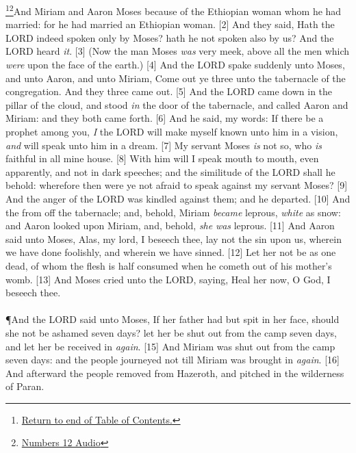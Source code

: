 \footnote{\textcolor[cmyk]{0.99998,1,0,0}{\hyperlink{TOC}{Return to end of Table of Contents.}}}\footnote{\href{https://audiobible.com/bible/numbers_12.html}{\textcolor[cmyk]{0.99998,1,0,0}{Numbers 12 Audio}}}\textcolor[cmyk]{0.99998,1,0,0}{And Miriam and Aaron  Moses because of the Ethiopian woman whom he had married: for he had married an Ethiopian woman.}
[2] \textcolor[cmyk]{0.99998,1,0,0}{And they said, Hath the LORD indeed spoken only by Moses? hath he not spoken also by us? And the LORD heard \emph{it}.}
[3] \textcolor[cmyk]{0.99998,1,0,0}{(Now the man Moses \emph{was} very meek, above all the men which \emph{were} upon the face of the earth.)}
[4] \textcolor[cmyk]{0.99998,1,0,0}{And the LORD spake suddenly unto Moses, and unto Aaron, and unto Miriam, Come out ye three unto the tabernacle of the congregation. And they three came out.}
[5] \textcolor[cmyk]{0.99998,1,0,0}{And the LORD came down in the pillar of the cloud, and stood \emph{in} the door of the tabernacle, and called Aaron and Miriam: and they both came forth.}
[6] \textcolor[cmyk]{0.99998,1,0,0}{And he said,  my words: If there be a prophet among you, \emph{I} the LORD will make myself known unto him in a vision, \emph{and} will speak unto him in a dream.}
[7] \textcolor[cmyk]{0.99998,1,0,0}{My servant Moses \emph{is} not so, who \emph{is} faithful in all mine house.}
[8] \textcolor[cmyk]{0.99998,1,0,0}{With him will I speak mouth to mouth, even apparently, and not in dark speeches; and the similitude of the LORD shall he behold: wherefore then were ye not afraid to speak against my servant Moses?}
[9] \textcolor[cmyk]{0.99998,1,0,0}{And the anger of the LORD was kindled against them; and he departed.}
[10] \textcolor[cmyk]{0.99998,1,0,0}{And the  from off the tabernacle; and, behold, Miriam \emph{became} leprous, \emph{white} as snow: and Aaron looked upon Miriam, and, behold, \emph{she} \emph{was} leprous.}
[11] \textcolor[cmyk]{0.99998,1,0,0}{And Aaron said unto Moses, Alas, my lord, I beseech thee, lay not the sin upon us, wherein we have done foolishly, and wherein we have sinned.}
[12] \textcolor[cmyk]{0.99998,1,0,0}{Let her not be as one dead, of whom the flesh is half consumed when he cometh out of his mother's womb.}
[13] \textcolor[cmyk]{0.99998,1,0,0}{And Moses cried unto the LORD, saying, Heal her now, O God, I beseech thee.}\\
\\
\P \textcolor[cmyk]{0.99998,1,0,0}{And the LORD said unto Moses, If her father had but spit in her face, should she not be ashamed seven days? let her be shut out from the camp seven days, and  let her be received in \emph{again}.}
[15] \textcolor[cmyk]{0.99998,1,0,0}{And Miriam was shut out from the camp seven days: and the people journeyed not till Miriam was brought in \emph{again}.}
[16] \textcolor[cmyk]{0.99998,1,0,0}{And afterward the people removed from Hazeroth, and pitched in the wilderness of Paran.}